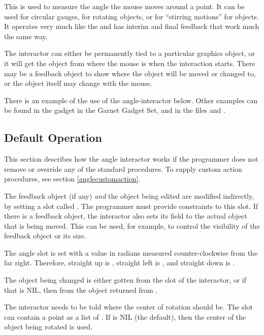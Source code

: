 This is used to measure the angle the mouse moves around a point.  It can
be used for circular gauges, for rotating objects, or for ``stirring
motions'' for objects. %
It operates very much like the  and has
interim and final feedback that work much the same way.

The interactor can either be permanently tied to a particular graphics
object, or it will get the object from where the mouse is when the
interaction starts.  There may be a feedback object to show where the
object will be moved or changed to, or the object itself may change with
the mouse.

There is an example of the use of the angle-interactor below.  Other
examples can be found in
the  gadget in
the Garnet Gadget Set, and in the files  and
.

\subsection{Default Operation}

This section describes how the angle interactor works
if the programmer does not remove or override any of the standard
 procedures.  To supply custom action procedures, see section
\ref{anglecustomaction}.

The feedback object (if any) {\it and}
the object being edited are modified indirectly, by setting a slot called
.  The programmer must provide constraints to this slot.
If there is a feedback object, the interactor also sets its
 field to the actual object that is being moved.
This can be used, for example,
to control the visibility of the feedback object or its size.

The angle slot is set with a value in radians measured counter-clockwise
from the far right.  Therefore, straight up is , straight left
is , and straight down is .

The object being changed is
either gotten from the  slot of the interactor, or if
that is NIL, then from the object returned from .

The interactor needs to be told where the center of rotation should be.
The slot  can contain a point as a list of
.  If   is NIL (the default), then the
center of the object being rotated is used.

